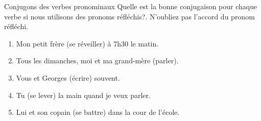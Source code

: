 \begin{frame}{Conjugons des verbes pronominaux}
  Quelle est la bonne conjugaison pour chaque verbe si nous utilisons des pronoms réfléchis?.
  N'oubliez pas l'accord du pronom réfléchi.
  \begin{enumerate}
    \item Mon petit frère \underline{} (se réveiller) à 7h30 le matin.
    \item Tous les dimanches, moi et ma grand-mère \underline{} (parler).
    \item Vous et Georges \underline{} (écrire) souvent.
    \item Tu \underline{} (se lever) la main quand je veux parler.
    \item Lui et son copain \underline{} (se battre) dans la cour de l'école.
  \end{enumerate}
\end{frame}